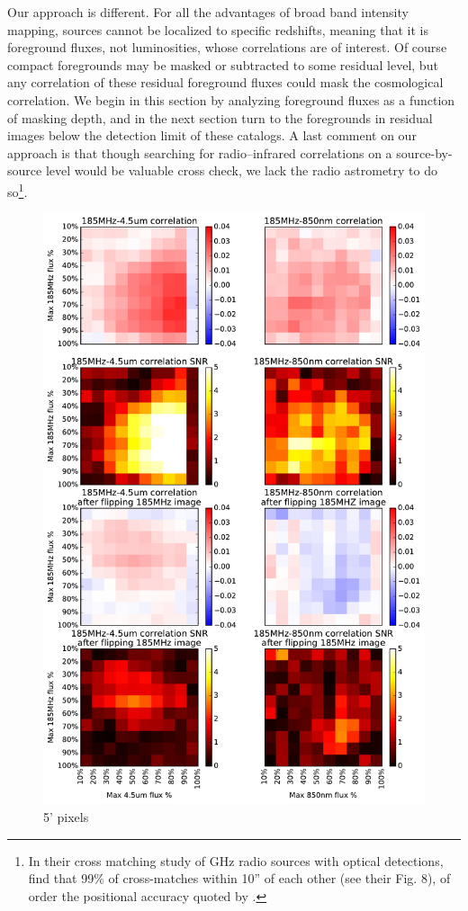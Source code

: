 \documentclass[preprint]{aastex}
\begin{document}
Our approach is different. For all the advantages of broad band intensity mapping, sources cannot be localized to specific redshifts, meaning that it is foreground fluxes, not luminosities, whose correlations are of interest. Of course compact foregrounds may be masked or subtracted to some residual level, but any correlation of these residual foreground fluxes could mask the cosmological correlation. We begin in this section by analyzing foreground fluxes as a function of masking depth, and in the next section turn to the foregrounds in residual images below the detection limit of these catalogs. A last comment on our approach is that though searching for radio--infrared correlations on a source-by-source level would be valuable cross check, we lack the radio astrometry to do so\footnote{In their cross matching study of GHz radio sources with optical detections, \citep{mcmahon02} find that 99\% of cross-matches within 10'' of each other (see their Fig. 8), of order the positional accuracy quoted by \citet{PattiCatalog1}.}. 

\begin{figure}[h]
\centering
\includegraphics[width=5.5in]{images/source_correlation_grids_and_snrs.pdf}
\caption{5' pixels}
\label{fig:correlationsandSNRs}
\end{figure}
\end{document}
